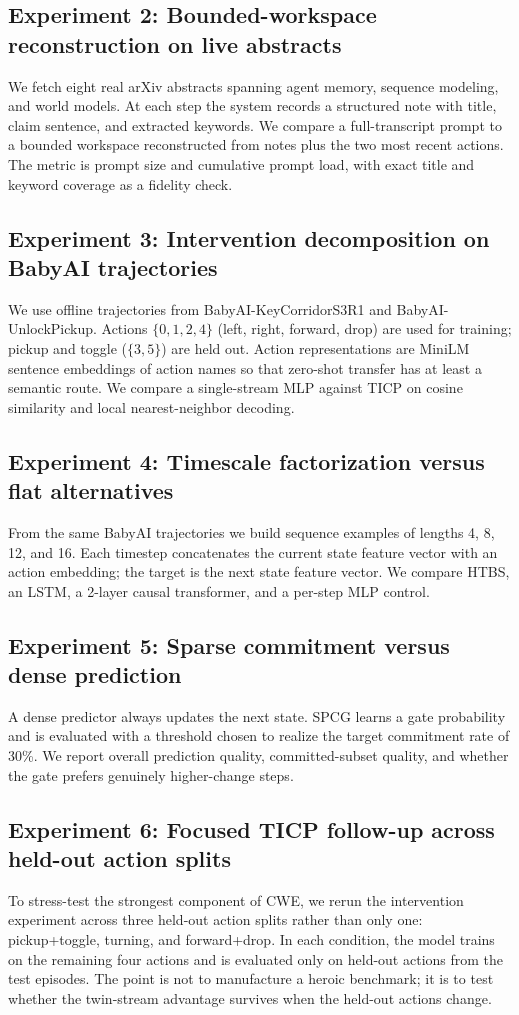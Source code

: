 \documentclass[11pt]{article}
\begin{document}
\subsection{Experiment 2: Bounded-workspace reconstruction on live abstracts}
We fetch eight real arXiv abstracts spanning agent memory, sequence modeling, and world models. At each step the system records a structured note with title, claim sentence, and extracted keywords. We compare a full-transcript prompt to a bounded workspace reconstructed from notes plus the two most recent actions. The metric is prompt size and cumulative prompt load, with exact title and keyword coverage as a fidelity check.

\subsection{Experiment 3: Intervention decomposition on BabyAI trajectories}
We use offline trajectories from BabyAI-KeyCorridorS3R1 and BabyAI-UnlockPickup. Actions $\{0,1,2,4\}$ (left, right, forward, drop) are used for training; pickup and toggle ($\{3,5\}$) are held out. Action representations are MiniLM sentence embeddings of action names so that zero-shot transfer has at least a semantic route. We compare a single-stream MLP against TICP on cosine similarity and local nearest-neighbor decoding.

\subsection{Experiment 4: Timescale factorization versus flat alternatives}
From the same BabyAI trajectories we build sequence examples of lengths 4, 8, 12, and 16. Each timestep concatenates the current state feature vector with an action embedding; the target is the next state feature vector. We compare HTBS, an LSTM, a 2-layer causal transformer, and a per-step MLP control.

\subsection{Experiment 5: Sparse commitment versus dense prediction}
A dense predictor always updates the next state. SPCG learns a gate probability and is evaluated with a threshold chosen to realize the target commitment rate of 30\%. We report overall prediction quality, committed-subset quality, and whether the gate prefers genuinely higher-change steps.

\subsection{Experiment 6: Focused TICP follow-up across held-out action splits}
To stress-test the strongest component of CWE, we rerun the intervention experiment across three held-out action splits rather than only one: pickup+toggle, turning, and forward+drop. In each condition, the model trains on the remaining four actions and is evaluated only on held-out actions from the test episodes. The point is not to manufacture a heroic benchmark; it is to test whether the twin-stream advantage survives when the held-out actions change.
\end{document}

